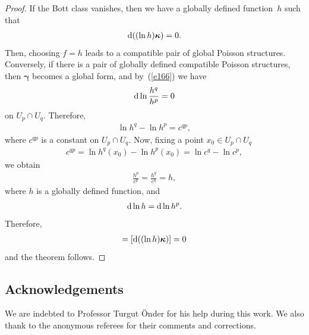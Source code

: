 \documentclass[pdftex]{sigma}
\numberwithin{equation}{section}
\begin{document}
\begin{proof}
If the Bott class vanishes, then we have a globally def\/ined function~$h$ such that
\begin{gather*}
{\rm d} ( ( \ln h ) \boldsymbol{\kappa } ) =0.
\end{gather*}
Then, choosing $f=h$ leads to a compatible pair of global Poisson structures. Conversely, if there is a pair of globally def\/ined compatible Poisson structures, then $\boldsymbol{\gamma }$ becomes a global form, and by~(\ref{e166}) we have
\begin{gather*}
{\rm d}\ln \frac{h^{q}}{h^{p}}=0
\end{gather*}
on $U_{p}\cap U_{q}$. Therefore,
\begin{gather*}
\ln h^{q}-\ln h^{p}=c^{qp},
\end{gather*}
where $c^{qp}$ is a constant on $U_{p}\cap U_{q}$. Now, f\/ixing a point $x_{0}\in U_{p}\cap U_{q}$
\begin{gather*}
c^{qp}=\ln h^{q} ( x_{0} ) -\ln h^{p} ( x_{0} ) =\ln c^{q}-\ln c^{p},
\end{gather*}
we obtain
\begin{gather*}
\frac{h^{p}}{c^{p}}=\frac{h^{q}}{c^{q}}=h,
\end{gather*}
where $h$ is a globally def\/ined function, and
\begin{gather*}
{\rm d}\ln h={\rm d}\ln h^{p}.
\end{gather*}
Therefore,
\begin{gather*}
 [ \boldsymbol{h}_{1}\wedge \boldsymbol{c}_{1} ] = [ {\rm d} (( \ln h) \boldsymbol{\kappa })] =0 \label{e173}
\end{gather*}
and the theorem follows.
\end{proof}

\subsection*{Acknowledgements}
We are indebted to Professor Turgut \"{O}nder for his help during this work. We also thank to the anonymous referees for their comments and corrections.
\end{document}
